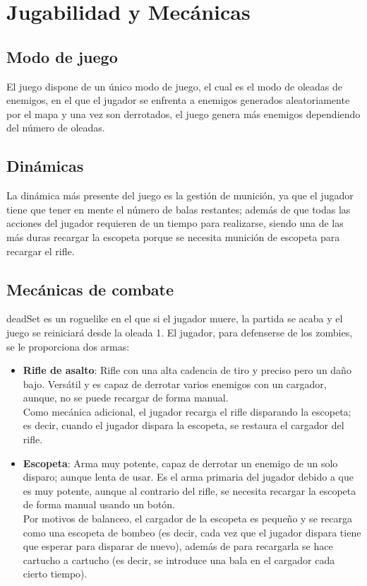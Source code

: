 \documentclass[12pt]{article}
\begin{document}
\section{Jugabilidad y Mecánicas}
    \subsection{Modo de juego}
        El juego dispone de un único modo de juego, el cual es el modo de oleadas de enemigos, en el que el jugador se enfrenta a enemigos generados aleatoriamente por el mapa y una vez son derrotados, el juego genera más enemigos dependiendo del número de oleadas.

    \subsection{Dinámicas}
        La dinámica más presente del juego es la gestión de munición, ya que el jugador tiene que tener en mente el número de balas restantes; además de que todas las acciones del jugador requieren de un tiempo para realizarse, siendo una de las más duras recargar la escopeta porque se necesita munición de escopeta para recargar el rifle. 
    
    \subsection{Mecánicas de combate}
        \textunderscore deadSet es un roguelike en el que si el jugador muere, la partida se acaba y el juego se reiniciará desde la oleada 1. El jugador, para defenserse de los zombies, se le proporciona dos armas:
        
            \begin{itemize}
            
                \item \textbf{Rifle de asalto}: Rifle con una alta cadencia de tiro y preciso pero un daño bajo. Versátil y es capaz de derrotar varios enemigos con un cargador, aunque, no se puede recargar de forma manual.\\ Como mecánica adicional, el jugador recarga el rifle disparando la escopeta; es decir, cuando el jugador dispara la escopeta, se restaura el cargador del rifle.
                
                \item \textbf{Escopeta}: Arma muy potente, capaz de derrotar un enemigo de un solo disparo; aunque lenta de usar. Es el arma primaria del jugador debido a que es muy potente, aunque al contrario del rifle, se necesita recargar la escopeta de forma manual usando un botón.\\ 
                Por motivos de balanceo, el cargador de la escopeta es pequeño y se recarga como una escopeta de bombeo (es decir, cada vez que el jugador dispara tiene que esperar para disparar de nuevo), además de para recargarla se hace cartucho a cartucho (es decir, se introduce una bala en el cargador cada cierto tiempo).
            \end{itemize}
\end{document}
